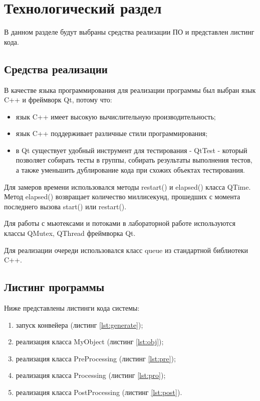 \chapter{ Технологический раздел}
\label{cha:technological}

    В данном разделе будут выбраны средства реализации ПО и представлен листинг кода. 

    \section{Средства реализации}
В качестве языка программирования для реализации программы был выбран язык C++ и фреймворк Qt, потому что:
\begin{itemize}
	\item язык C++ имеет высокую вычислительную производительность;
	\item язык C++ поддерживает различные стили программирования;
	\item в Qt существует удобный инструмент для тестирования - QtTest - который позволяет собирать тесты в группы, собирать результаты выполнения тестов, а также уменьшить дублирование кода при схожих объектах тестирования.
\end{itemize}

Для замеров времени использовался методы restart() и elapsed() класса QTime. Метод elapsed() возвращает количество миллисекунд, прошедших с момента последнего вызова start() или restart().

Для работы с мьютексами и потоками в лабораторной работе используются классы QMutex, QThread фреймворка Qt.

Для реализации очереди использовался класс queue из стандартной библиотеки C++.

    \section{Листинг программы}
        Ниже представлены листинги кода системы:
        \begin{enumerate}
            \item запуск конвейера (листинг \ref{lst:generate});
            \item реализация класса MyObject (листинг \ref{lst:obj});
            \item реализация класса PreProcessing (листинг \ref{lst:pre});
            \item реализация класса Processing (листинг \ref{lst:pro});
		\item реализация класса PostProcessing (листинг \ref{lst:post}).
        \end{enumerate}
        
